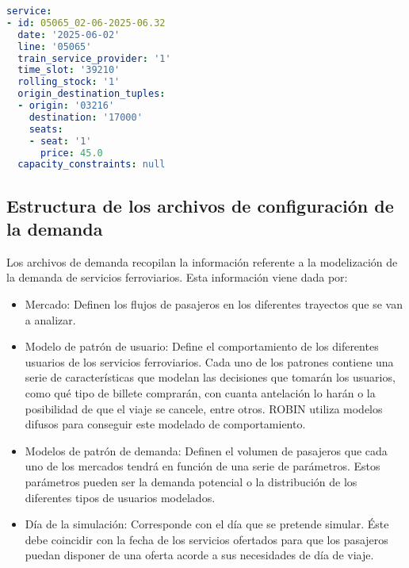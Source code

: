 \begin{lstlisting}[language=YAML,
                   frame=none,
                   numbers=none,
                   basicstyle=\ttfamily\normalsize,
                   caption={Ejemplo con datos reales de la estructura de \texttt{service}},
                   label=src:ejemploEstructuraService,
                   inputencoding=utf8]
service:
- id: 05065_02-06-2025-06.32
  date: '2025-06-02'
  line: '05065'
  train_service_provider: '1'
  time_slot: '39210'
  rolling_stock: '1'
  origin_destination_tuples:
  - origin: '03216'
    destination: '17000'
    seats:
    - seat: '1'
      price: 45.0
  capacity_constraints: null
\end{lstlisting}



\subsection{Estructura de los archivos de configuración de la demanda}\label{sec:EstructuraArchivoDemanda}

Los archivos de demanda recopilan la información referente a la modelización de la demanda de servicios ferroviarios. Esta información viene dada por:
\begin{itemize}
    \item Mercado: Definen los flujos de pasajeros en los diferentes trayectos que se van a analizar.
    \item Modelo de patrón de usuario: Define el comportamiento de los diferentes usuarios de los servicios ferroviarios. Cada uno de los patrones contiene una serie de características que modelan las decisiones que tomarán los usuarios, como qué tipo de billete comprarán, con cuanta antelación lo harán o la posibilidad de que el viaje se cancele, entre otros. \acrshort{ROBIN} utiliza modelos difusos para conseguir este modelado de comportamiento.
    \item Modelos de patrón de demanda: Definen el volumen de pasajeros que cada uno de los mercados tendrá en función de una serie de parámetros. Estos parámetros pueden ser la demanda potencial o la distribución de los diferentes tipos de usuarios modelados.
    \item Día de la simulación: Corresponde con el día que se pretende simular. Éste debe coincidir con la fecha de los servicios ofertados para que los pasajeros puedan disponer de una oferta acorde a sus necesidades de día de viaje.
\end{itemize}

